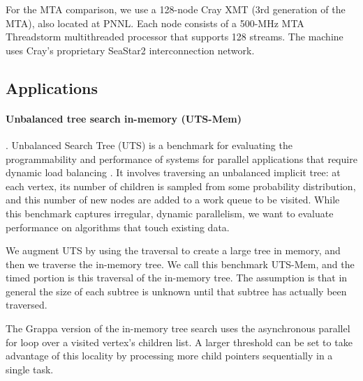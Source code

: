 For the MTA comparison, we use a 128-node Cray XMT (3rd generation
of the MTA), also located at PNNL. Each node consists of a 500-MHz MTA Threadstorm multithreaded
processor that supports 128 streams. The machine uses Cray's proprietary
SeaStar2 interconnection network.

\subsection{Applications}

\paragraph{Unbalanced tree search in-memory (UTS-Mem)}. Unbalanced
Search Tree (UTS) is a benchmark
for evaluating the programmability and performance of systems for
parallel applications that require dynamic load balancing
\cite{Olivier:uts2006}. It involves traversing an unbalanced implicit
tree: at each vertex, its number of children is sampled from some
probability distribution, and this number of new nodes are added to a
work queue to be visited. While this benchmark captures irregular,
dynamic parallelism, we want to evaluate performance on algorithms
that touch existing data. 

We augment UTS by using the traversal to
create a large tree in memory, and then we traverse the in-memory
tree. We call this benchmark UTS-Mem, and the timed portion is this traversal of the in-memory tree. The assumption is that in general the size of each subtree is unknown until that subtree has actually been traversed.


The Grappa version of the in-memory tree search uses the asynchronous parallel for loop over a visited vertex's children list. A larger threshold can be set to take advantage of this locality by processing more child pointers sequentially in a single task.

